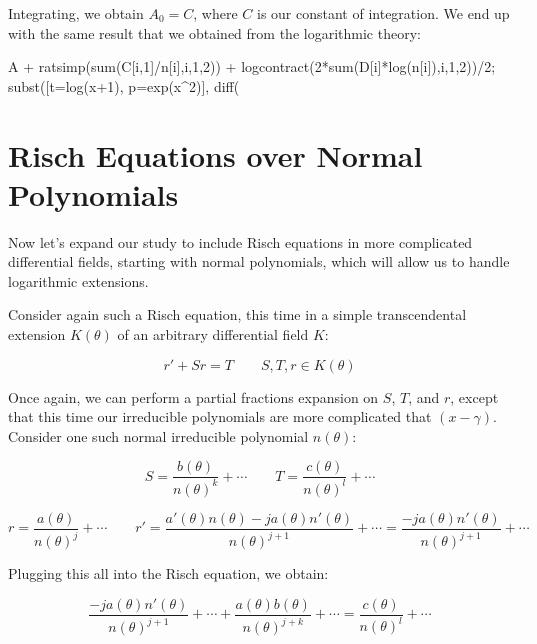 \begin{comment}
\begin{maximacode}
rest(arrayinfo(D),2);
map(lambda([u], arraymake(D,u)), %
map(display,%
/* displayarray(D); */
\end{maximacode}
\end{comment}

Integrating, we obtain $A_0 = C$, where $C$ is our constant of integration.  We end up with
the same result that we obtained from the logarithmic theory:

\begin{maximacode}
A + ratsimp(sum(C[i,1]/n[i],i,1,2))
  + logcontract(2*sum(D[i]*log(n[i]),i,1,2))/2;
subst([t=log(x+1), p=exp(x^2)], %
diff(%
\end{maximacode}

\endexample

\vfill\eject
\section{Risch Equations over Normal Polynomials}

Now let's expand our study to include Risch equations in more
complicated differential fields, starting with normal polynomials,
which will allow us to handle logarithmic extensions.

Consider again such a Risch equation, this time in a simple
transcendental extension $K(\theta)$ of an arbitrary differential
field $K$:

$$r' + S r = T \qquad S,T,r \in K(\theta)$$

Once again, we can perform a partial fractions expansion on $S$, $T$,
and $r$, except that this time our irreducible polynomials are more
complicated that $(x-\gamma)$.  Consider one such normal irreducible
polynomial $n(\theta)$:

$$S = \frac{b(\theta)}{n(\theta)^k} + \cdots
\qquad T = \frac{c(\theta)}{n(\theta)^l} + \cdots$$

$$r = \frac{a(\theta)}{n(\theta)^j} + \cdots  \qquad
r' = \frac{a'(\theta)n(\theta)-ja(\theta)n'(\theta)}{n(\theta)^{j+1}} + \cdots = \frac{-ja(\theta)n'(\theta)}{n(\theta)^{j+1}} + \cdots$$

Plugging this all into the Risch equation, we obtain:

$$\frac{-ja(\theta)n'(\theta)}{n(\theta)^{j+1}} + \cdots + \frac{a(\theta) b(\theta)}{n(\theta)^{j+k}} + \cdots = \frac{c(\theta)}{n(\theta)^l} + \cdots$$

